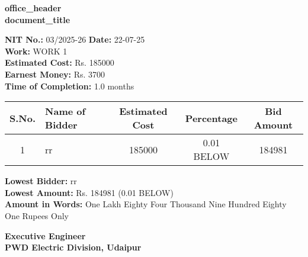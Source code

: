 \documentclass[12pt,a4paper]{article}
\begin{document}
\begin{center}
\textbf{{{office_header}}}\\[0.3cm]
\textbf{{{document_title}}}\\[0.2cm]
\end{center}

\vspace{0.5cm}

\noindent
\textbf{NIT No.:} 03/2025-26 \hfill \textbf{Date:} 22-07-25\\
\textbf{Work:} WORK 1\\
\textbf{Estimated Cost:} Rs. 185000\\
\textbf{Earnest Money:} Rs. 3700\\
\textbf{Time of Completion:} 1.0 months

\vspace{0.5cm}

\begin{longtable}{|c|p{4cm}|c|c|c|}
\hline
\textbf{S.No.} & \textbf{Name of Bidder} & \textbf{Estimated Cost} & \textbf{Percentage} & \textbf{Bid Amount} \\
\hline
1 & rr & 185000 & 0.01 BELOW & 184981 \\
\hline
\end{longtable}

\vspace{0.5cm}

\noindent
\textbf{Lowest Bidder:} rr\\
\textbf{Lowest Amount:} Rs. 184981 (0.01 BELOW)\\
\textbf{Amount in Words:} One Lakh Eighty Four Thousand Nine Hundred Eighty One Rupees Only

\vspace{1cm}

\noindent
\textbf{Executive Engineer}\\
\textbf{PWD Electric Division, Udaipur}
\end{document}
